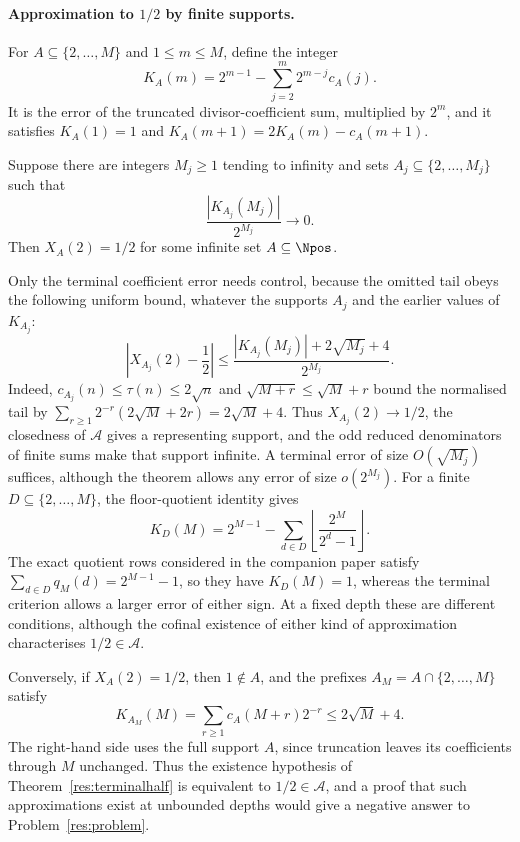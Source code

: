 \documentclass[11pt]{article}
\newcommand{\Ach}{\mathcal A}
\begin{document}
\paragraph{Approximation to $1/2$ by finite supports.}
For $A\subseteq\{2,\ldots,M\}$ and $1\le m\le M$, define the integer
\[
 K_A(m)=2^{m-1}-\sum_{j=2}^{m}2^{m-j}c_A(j).
\]
It is the error of the truncated divisor-coefficient sum, multiplied by
$2^m$, and it satisfies $K_A(1)=1$ and $K_A(m+1)=2K_A(m)-c_A(m+1)$.

\begin{theorem}
\label{res:terminalhalf}
Suppose there are integers $M_j\ge1$ tending to infinity and sets
$A_j\subseteq\{2,\ldots,M_j\}$ such that
\[
 \frac{|K_{A_j}(M_j)|}{2^{M_j}}\longrightarrow0.
\]
Then $X_A(2)=1/2$ for some infinite set $A\subseteq\Npos$.
\end{theorem}

Only the terminal coefficient error needs control, because the omitted
tail obeys the following uniform bound, whatever the supports $A_j$ and
the earlier values of $K_{A_j}$:
\[
 \left|X_{A_j}(2)-\frac12\right|
 \le \frac{|K_{A_j}(M_j)|+2\sqrt{M_j}+4}{2^{M_j}}.
\]
Indeed, $c_{A_j}(n)\le\tau(n)\le2\sqrt n$ and
$\sqrt{M+r}\le\sqrt M+r$ bound the normalised tail by
$\sum_{r\ge1}2^{-r}(2\sqrt M+2r)=2\sqrt M+4$. Thus
$X_{A_j}(2)\to1/2$, the closedness of $\Ach$ gives a representing
support, and the odd reduced denominators of finite sums make that
support infinite. A terminal error of size $O(\sqrt{M_j})$ suffices,
although the theorem allows any error of size $o(2^{M_j})$. For a finite $D\subseteq\{2,\ldots,M\}$, the
floor-quotient identity gives
\[
 K_D(M)=2^{M-1}-\sum_{d\in D}
                \left\lfloor\frac{2^M}{2^d-1}\right\rfloor.
\]
The exact quotient rows considered in the companion paper satisfy
$\sum_{d\in D}q_M(d)=2^{M-1}-1$, so they have $K_D(M)=1$, whereas the
terminal criterion allows a larger error of either sign. At a fixed
depth these are different conditions, although the cofinal existence
of either kind of approximation characterises $1/2\in\Ach$.

Conversely, if $X_A(2)=1/2$, then $1\notin A$, and the prefixes
$A_M=A\cap\{2,\ldots,M\}$ satisfy
\[
 K_{A_M}(M)=\sum_{r\ge1}c_A(M+r)2^{-r}
       \le 2\sqrt M+4.
\]
The right-hand side uses the full support $A$, since truncation leaves
its coefficients through $M$ unchanged. Thus the existence hypothesis of
Theorem~\ref{res:terminalhalf} is equivalent to $1/2\in\Ach$, and a
proof that such approximations exist at unbounded depths would give a
negative answer to Problem~\ref{res:problem}.
\end{document}
